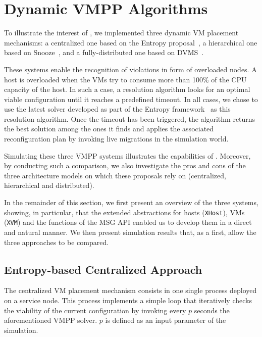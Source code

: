 \section{Dynamic VMPP Algorithms}
\label{sec:vm-schedulers}

To illustrate the interest of \vmps, we implemented three dynamic VM
placement mechanisms: a centralized one based on the Entropy
proposal~\cite{Hermenier:2009:ECM:1508293.1508300}, a hierarchical one
based on Snooze~\cite{feller:ccgrid12}, and a fully-distributed one
based on DVMS~\cite{quesnel:cpe2012}.

These systems enable the recognition of violations in form of
overloaded nodes. A host is overloaded when the VMs try to consume
more than 100\% of the CPU capacity of the host. In such a case, a
resolution algorithm looks for an optimal viable configuration until
it reaches a predefined timeout. In all cases, we chose to use the
latest solver developed as part of the Entropy
framework~\cite{hermenier:cp11} as this resolution algorithm.
Once the timeout has been triggered, the algorithm returns the best
solution among the ones it finds and applies the associated
reconfiguration plan by invoking live migrations in the simulation
world.
%
%

Simulating these three VMPP systems illustrates the capabilities of
\vmps. Moreover, by conducting such a comparison, we also investigate
the pros and cons of the three architecture models on which these
proposals rely on (\ie centralized, hierarchical and distributed).

In the remainder of this section, we first present an overview of the
three systems, showing, in particular, that the extended abstractions
for hosts (\texttt{XHost}), VMs (\texttt{XVM}) and the functions of
the \sg MSG API enabled us to develop them in a direct and natural
manner. We then present simulation results that, as a first, allow the
three approaches to be compared.

\subsection{Entropy-based Centralized Approach}
\label{subsec:entropy}
The centralized VM placement mechanism consists in one single \sg
process deployed on a service node. This process implements a simple loop that
iteratively checks the viability of the current configuration by
invoking every $p$ seconds the aforementioned VMPP solver. $p$ is
defined as an input parameter of the simulation.

